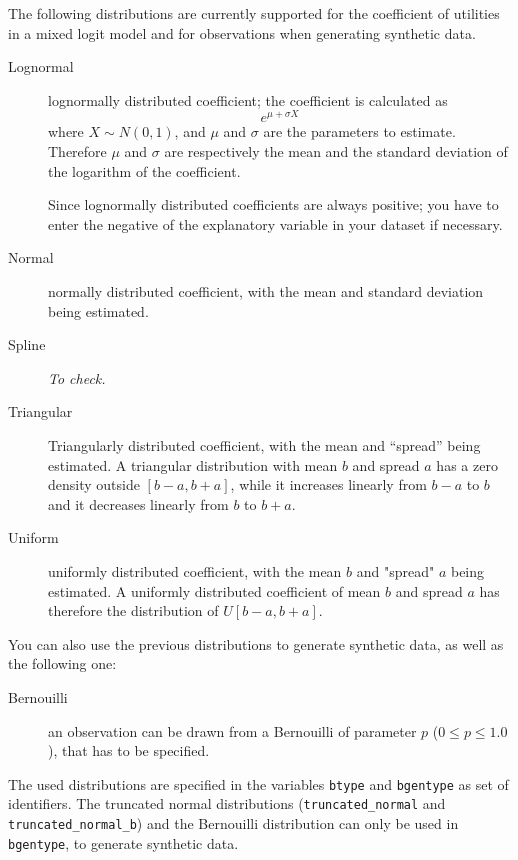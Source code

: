 The following distributions are currently supported for the
coefficient of utilities in a mixed logit model and for observations
when generating synthetic data.
\begin{description}
\item[Lognormal]
lognormally distributed coefficient; the coefficient is calculated as
\[e^{\mu + \sigma X}\] where $X \sim N(0,1)$, and $\mu$ and $\sigma$
are the parameters to estimate. Therefore $\mu$ and $\sigma$ are
respectively the mean and the standard deviation of the logarithm of
the coefficient.


Since lognormally distributed coefficients are always positive; you
have to enter the negative of the explanatory variable in your
dataset if necessary.
\item[Normal] normally distributed coefficient, with the mean and
standard deviation being estimated.
\item[Spline] \textit{To check.}
\item[Triangular]
Triangularly distributed coefficient, with the mean and ``spread'' being
estimated. A triangular distribution with mean $b$ and spread $a$ has
a zero density outside $[b-a, b+a]$, while it increases linearly from
$b-a$ to $b$ and it decreases linearly from $b$ to $b+a$.
\item[Uniform]
uniformly distributed coefficient, with the mean $b$ and "spread" $a$
being estimated. A uniformly distributed coefficient of mean $b$ and
spread $a$ has therefore the distribution of $U[b-a,b+a]$.
\end{description}

You can also use the previous distributions to generate synthetic
data, as well as the following one:
\begin{description}
\item[Bernouilli] an observation can be drawn from a Bernouilli of
parameter $p$ ($0 \leq p \leq 1.0$), that has to be specified.
\end{description}

The used distributions are specified in the variables
\verb|btype| and \verb|bgentype|
as set of identifiers.
The truncated normal distributions (\verb|truncated_normal| and
\verb|truncated_normal_b|) and the Bernouilli distribution can only be
used in \verb|bgentype|, to generate synthetic data.

